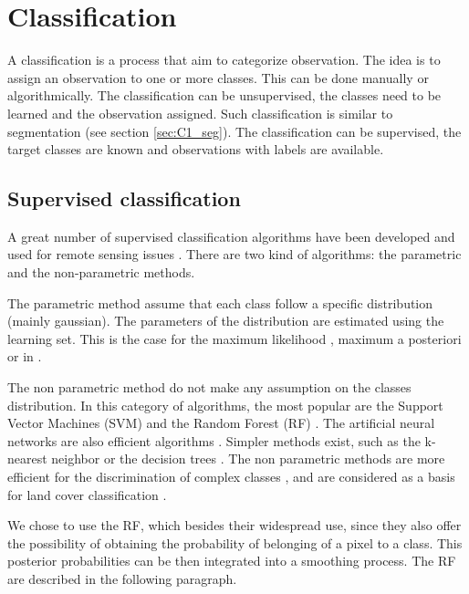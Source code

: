 \section{Classification}
A classification is a process that aim to categorize observation. The idea is to assign an observation to one or more classes. This can be done manually or algorithmically. The classification can be unsupervised, the classes need to be learned and the observation assigned. Such classification is similar to segmentation (see section \ref{sec:C1_seg}). The classification can be supervised, the target classes are known and observations with labels are available.

\subsection{Supervised classification}
A great number of supervised classification algorithms have been developed and used for remote sensing issues \citep{landgrebe2005signal, lu2007survey, mather2016classification}. There are two kind of algorithms: the parametric and the non-parametric methods.

The parametric method assume that each class follow a specific distribution (mainly gaussian). The parameters of the distribution are estimated using the learning set. This is the case for the maximum likelihood \citep{strahler1980use}, maximum a posteriori \citep{fauvel2015fast} or in \cite{trias2005high}.

The non parametric method do not make any assumption on the classes distribution. In this category of algorithms, the most popular are the Support Vector Machines (SVM) \citep{boser1992training, scholkopf2001learning} and the Random Forest (RF) \citep{breiman2001random}. The artificial neural networks are also efficient algorithms \citep{hepner1990artificial, atkinson1997mapping}. Simpler methods exist, such as the k-nearest neighbor \citep{indyk1998approximate} or the decision trees \citep{breiman1984classification}. The non parametric methods are more efficient  for the discrimination of complex classes \citep{paola1995review, foody2002status}, and are considered as a basis for land cover classification \citep{camps2009kernel}.

We chose to use the RF, which besides their widespread use, since they also offer the possibility of obtaining the probability of belonging of a pixel to a class. This posterior probabilities can be then integrated into a smoothing process. The RF are described in the following paragraph.

